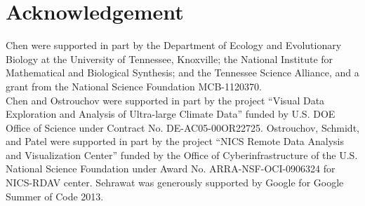 \section*{Acknowledgement}

Chen were supported in part by
the Department of Ecology and Evolutionary Biology at the
University of Tennessee, Knoxville; the National Institute for Mathematical
and Biological Synthesis; and the Tennessee Science Alliance, and a grant from
the National Science Foundation MCB-1120370.
\\

Chen and Ostrouchov were supported in part by the project
``Visual Data Exploration and Analysis of Ultra-large Climate Data''
funded by U.S. DOE Office of Science
under Contract No. DE-AC05-00OR22725.
Ostrouchov, Schmidt, and Patel were supported in part by the project
``NICS Remote Data Analysis and Visualization Center''
funded by the Office of Cyberinfrastructure of the
U.S. National Science Foundation
under Award No. ARRA-NSF-OCI-0906324 for NICS-RDAV center. 
Sehrawat was generously supported by Google for Google Summer of Code 2013.

